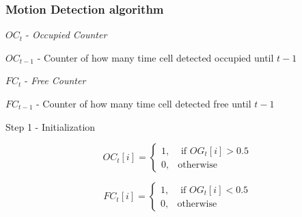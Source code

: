 \documentclass{beamer}
\begin{document}
	\begin{frame}
		\frametitle{Motion Detection algorithm}

		$OC_t$ - \textit{Occupied Counter}
		
		$OC_{t-1}$ - Counter of how many time cell detected occupied until $t-1$
		
		$FC_t$ - \textit{Free Counter}
		
		$FC_{t-1}$ - Counter of how many time cell detected free until $t-1$


		\begin{block}{Step 1 - Initialization}

			\begin{equation}
			OC_t[i] =  \begin{cases} 1, & \mbox{ if $OG_t[i] > 0.5$} \\
			                       0, & \mbox{otherwise} \end{cases}
			\end{equation}

			\begin{equation}
			FC_t[i] = \begin{cases} 1, & \mbox{ if $OG_t[i] < 0.5$} \\
			                       0, & \mbox{otherwise} \end{cases}
			\end{equation}			
		
		\end{block}

%
%		  

	\end{frame}

%		
%		
%
\end{document}
